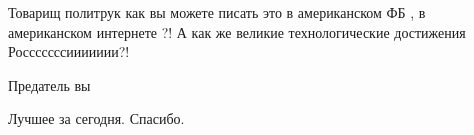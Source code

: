 \begin{itemize}
 
Товарищ политрук как вы можете писать это в американском ФБ , в американском
интернете ?! А как же великие технологические достижения Росссссссиииииии?!

Предатель вы

 
Лучшее за сегодня. Спасибо.

 


\end{itemize}
